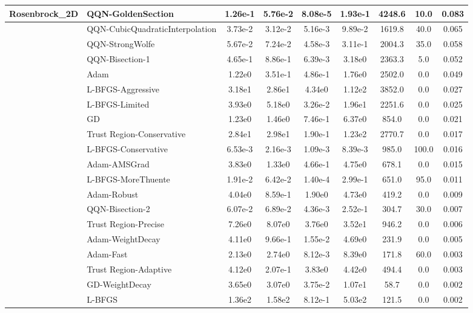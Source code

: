 \documentclass{article}
\begin{document}
\begin{longtable}{|l|l|c|c|c|c|c|c|c|}
Rosenbrock\_2D & \textbf{QQN-GoldenSection} & 1.26e-1 & 5.76e-2 & 8.08e-5 & 1.93e-1 & 4248.6 & 10.0 & 0.083 \\
\hline
 & QQN-CubicQuadraticInterpolation & 3.73e-2 & 3.12e-2 & 5.16e-3 & 9.89e-2 & 1619.8 & 40.0 & 0.065 \\
\hline
 & QQN-StrongWolfe & 5.67e-2 & 7.24e-2 & 4.58e-3 & 3.11e-1 & 2004.3 & 35.0 & 0.058 \\
\hline
 & QQN-Bisection-1 & 4.65e-1 & 8.86e-1 & 6.39e-3 & 3.18e0 & 2363.3 & 5.0 & 0.052 \\
\hline
 & Adam & 1.22e0 & 3.51e-1 & 4.86e-1 & 1.76e0 & 2502.0 & 0.0 & 0.049 \\
\hline
 & L-BFGS-Aggressive & 3.18e1 & 2.86e1 & 4.34e0 & 1.12e2 & 3852.0 & 0.0 & 0.027 \\
\hline
 & L-BFGS-Limited & 3.93e0 & 5.18e0 & 3.26e-2 & 1.96e1 & 2251.6 & 0.0 & 0.025 \\
\hline
 & GD & 1.23e0 & 1.46e0 & 7.46e-1 & 6.37e0 & 854.0 & 0.0 & 0.021 \\
\hline
 & Trust Region-Conservative & 2.84e1 & 2.98e1 & 1.90e-1 & 1.23e2 & 2770.7 & 0.0 & 0.017 \\
\hline
 & L-BFGS-Conservative & 6.53e-3 & 2.16e-3 & 1.09e-3 & 8.39e-3 & 985.0 & 100.0 & 0.016 \\
\hline
 & Adam-AMSGrad & 3.83e0 & 1.33e0 & 4.66e-1 & 4.75e0 & 678.1 & 0.0 & 0.015 \\
\hline
 & L-BFGS-MoreThuente & 1.91e-2 & 6.42e-2 & 1.40e-4 & 2.99e-1 & 651.0 & 95.0 & 0.011 \\
\hline
 & Adam-Robust & 4.04e0 & 8.59e-1 & 1.90e0 & 4.73e0 & 419.2 & 0.0 & 0.009 \\
\hline
 & QQN-Bisection-2 & 6.07e-2 & 6.89e-2 & 4.36e-3 & 2.52e-1 & 304.7 & 30.0 & 0.007 \\
\hline
 & Trust Region-Precise & 7.26e0 & 8.07e0 & 3.76e0 & 3.52e1 & 946.2 & 0.0 & 0.006 \\
\hline
 & Adam-WeightDecay & 4.11e0 & 9.66e-1 & 1.55e-2 & 4.69e0 & 231.9 & 0.0 & 0.005 \\
\hline
 & Adam-Fast & 2.13e0 & 2.74e0 & 8.12e-3 & 8.39e0 & 171.8 & 60.0 & 0.003 \\
\hline
 & Trust Region-Adaptive & 4.12e0 & 2.07e-1 & 3.83e0 & 4.42e0 & 494.4 & 0.0 & 0.003 \\
\hline
 & GD-WeightDecay & 3.65e0 & 3.07e0 & 3.75e-2 & 1.07e1 & 58.7 & 0.0 & 0.002 \\
\hline
 & L-BFGS & 1.36e2 & 1.58e2 & 8.12e-1 & 5.03e2 & 121.5 & 0.0 & 0.002 \\

\end{longtable}
\end{document}
